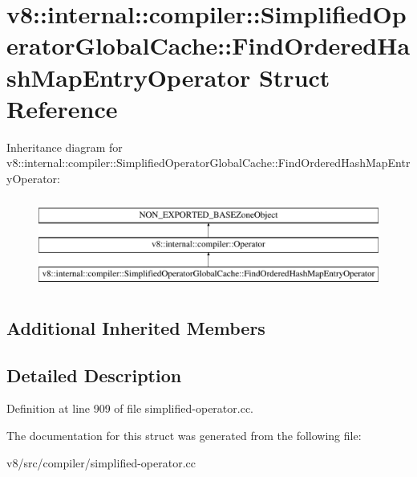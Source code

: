 \hypertarget{structv8_1_1internal_1_1compiler_1_1SimplifiedOperatorGlobalCache_1_1FindOrderedHashMapEntryOperator}{}\section{v8\+:\+:internal\+:\+:compiler\+:\+:Simplified\+Operator\+Global\+Cache\+:\+:Find\+Ordered\+Hash\+Map\+Entry\+Operator Struct Reference}
\label{structv8_1_1internal_1_1compiler_1_1SimplifiedOperatorGlobalCache_1_1FindOrderedHashMapEntryOperator}
Inheritance diagram for v8\+:\+:internal\+:\+:compiler\+:\+:Simplified\+Operator\+Global\+Cache\+:\+:Find\+Ordered\+Hash\+Map\+Entry\+Operator\+:\begin{figure}[H]
\begin{center}
\leavevmode
\includegraphics[height=3.000000cm]{structv8_1_1internal_1_1compiler_1_1SimplifiedOperatorGlobalCache_1_1FindOrderedHashMapEntryOperator}
\end{center}
\end{figure}
\subsection*{Additional Inherited Members}


\subsection{Detailed Description}


Definition at line 909 of file simplified-\/operator.\+cc.



The documentation for this struct was generated from the following file\+:\begin{DoxyCompactItemize}
\item 
v8/src/compiler/simplified-\/operator.\+cc\end{DoxyCompactItemize}
